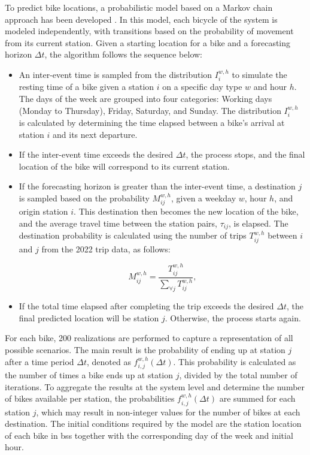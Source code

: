     To predict bike locations, a probabilistic model based on a Markov chain approach has been developed \cite{Lu2013, Huang2015}. In this model, each bicycle of the system is modeled independently, with transitions based on the probability of movement from its current station. Given a starting location for a bike and a forecasting horizon $\Delta t$, the algorithm follows the sequence below:

    \begin{itemize}
        \item An inter-event time is sampled from the distribution $I_i^{w,h}$ to simulate the resting time of a bike given a station $i$ on a specific day type $w$ and hour $h$. The days of the week are grouped into four categories: Working days (Monday to Thursday), Friday, Saturday, and Sunday. The distribution $I_i^{w,h}$ is calculated by determining the time elapsed between a bike’s arrival at station $i$ and its next departure.
        
        \item If the inter-event time exceeds the desired $\Delta t$, the process stops, and the final location of the bike will correspond to its current station. 
        
        \item If the forecasting horizon is greater than the inter-event time, a destination $j$ is sampled based on the probability $M_{ij}^{w,h}$, given a weekday $w$, hour $h$, and origin station $i$. This destination then becomes the new location of the bike, and the average travel time between the station pairs, $\tau_{ij}$, is elapsed. The destination probability is calculated using the number of trips $T_{ij}^{w,h}$ between $i$ and $j$ from the 2022 trip data, as follows:
        
            \begin{equation}
                M_{ij}^{w,h}=\frac{T_{ij}^{w,h}}{\sum_{\forall j} T_{ij}^{w,h}},
            \end{equation}

        \item If the total time elapsed after completing the trip exceeds the desired $\Delta t$, the final predicted location will be station $j$. Otherwise, the process starts again.
        
    \end{itemize}

    For each bike, 200 realizations are performed to capture a representation of all possible scenarios. The main result is the probability of ending up at station $j$ after a time period $\Delta t$, denoted as $f^{w,h}_{i,j}(\Delta t)$. This probability is calculated as the number of times a bike ends up at station $j$, divided by the total number of iterations. To aggregate the results at the system level and determine the number of bikes available per station, the probabilities $f^{w,h}_{i,j}(\Delta t)$ are summed for each station $j$, which may result in non-integer values for the number of bikes at each destination. The initial conditions required by the model are the station location of each bike in \ac{bss} together with the corresponding day of the week and initial hour.



